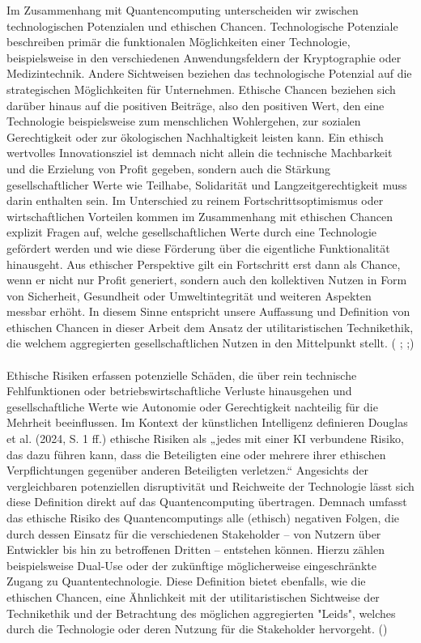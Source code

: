Im Zusammenhang mit Quantencomputing unterscheiden wir zwischen technologischen Potenzialen und ethischen Chancen. Technologische Potenziale beschreiben primär die funktionalen Möglichkeiten einer Technologie, beispielsweise in den verschiedenen Anwendungsfeldern der Kryptographie oder Medizintechnik. Andere Sichtweisen beziehen das technologische Potenzial auf die strategischen Möglichkeiten für Unternehmen. Ethische Chancen beziehen sich darüber hinaus auf die positiven Beiträge, also den positiven Wert, den eine Technologie beispielsweise zum menschlichen Wohlergehen, zur sozialen Gerechtigkeit oder zur ökologischen Nachhaltigkeit leisten kann. Ein ethisch wertvolles Innovationsziel ist demnach nicht allein die technische Machbarkeit und die Erzielung von Profit gegeben, sondern auch die Stärkung gesellschaftlicher Werte wie Teilhabe, Solidarität und Langzeitgerechtigkeit muss darin enthalten sein. Im Unterschied zu reinem Fortschrittsoptimismus oder wirtschaftlichen Vorteilen kommen im Zusammenhang mit ethischen Chancen explizit Fragen auf, welche gesellschaftlichen Werte durch eine Technologie gefördert werden und wie diese Förderung über die eigentliche Funktionalität hinausgeht. Aus ethischer Perspektive gilt ein Fortschritt erst dann als Chance, wenn er nicht nur Profit generiert, sondern auch den kollektiven Nutzen in Form von Sicherheit, Gesundheit oder Umweltintegrität und weiteren Aspekten messbar erhöht. In diesem Sinne entspricht unsere Auffassung und Definition von ethischen Chancen in dieser Arbeit dem Ansatz der utilitaristischen Technikethik, die welchem aggregierten gesellschaftlichen Nutzen in den Mittelpunkt stellt. (\cite{hoferPotentialbasedTechnologyPlanning2019} ;\cite{brusoniEthicsTechnologyOrganizational2017} ;\cite{bednarPowerEthicsUncovering2024})
\\
\\
Ethische Risiken erfassen potenzielle Schäden, die über rein technische Fehlfunktionen oder betriebswirtschaftliche Verluste hinausgehen und gesellschaftliche Werte wie Autonomie oder Gerechtigkeit nachteilig für die Mehrheit beeinflussen. Im Kontext der künstlichen Intelligenz definieren Douglas et al. (2024, S. 1 ff.) ethische Risiken als „jedes mit einer KI verbundene Risiko, das dazu führen kann, dass die Beteiligten eine oder mehrere ihrer ethischen Verpflichtungen gegenüber anderen Beteiligten verletzen.“ Angesichts der vergleichbaren potenziellen disruptivität und Reichweite der Technologie lässt sich diese Definition direkt auf das Quantencomputing übertragen. Demnach umfasst das ethische Risiko des Quantencomputings alle (ethisch) negativen Folgen, die durch dessen Einsatz für die verschiedenen Stakeholder – von Nutzern über Entwickler bis hin zu betroffenen Dritten – entstehen können. Hierzu zählen beispielsweise Dual-Use oder der zukünftige möglicherweise eingeschränkte Zugang zu Quantentechnologie. Diese Definition bietet ebenfalls, wie die ethischen Chancen, eine Ähnlichkeit mit der utilitaristischen Sichtweise der Technikethik und der Betrachtung des möglichen aggregierten "Leids", welches durch die Technologie oder deren Nutzung für die Stakeholder hervorgeht. (\cite{douglasEthicalRiskAI2025}) 
